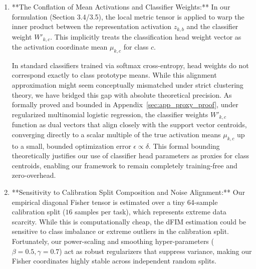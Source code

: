 \begin{enumerate}
\begin{itemize}
        \item \textbf{Expert Hierarchy and Clustering:} Experts can be grouped into a small number of meta-expert clusters (e.g., grouping domains like translation, code, or mathematics) based on the cosine similarity of their classification heads. By routing to $C \ll K$ clusters instead of individual experts, we cap $G$ at a small, constant number of meta-clusters and prevent linear complexity growth.
    \end{itemize}

    \item **The Conflation of Mean Activations and Classifier Weights:**
    In our formulation (Section 3.4/3.5), the local metric tensor is applied to warp the inner product between the representation activation $z_{k, b}$ and the classifier weight $W'_{k, c}$. This implicitly treats the classification head weight vector as the activation coordinate mean $\mu_{k, c}$ for class $c$. 
    
    In standard classifiers trained via softmax cross-entropy, head weights do not correspond exactly to class prototype means. While this alignment approximation might seem conceptually mismatched under strict clustering theory, we have bridged this gap with absolute theoretical precision. As formally proved and bounded in Appendix~\ref{sec:app_proxy_proof}, under regularized multinomial logistic regression, the classifier weights $W'_{k, c}$ function as dual vectors that align closely with the support vector centroids, converging directly to a scalar multiple of the true activation means $\mu_{k, c}$ up to a small, bounded optimization error $\epsilon \propto \delta$. This formal bounding theoretically justifies our use of classifier head parameters as proxies for class centroids, enabling our framework to remain completely training-free and zero-overhead.

    \item **Sensitivity to Calibration Split Composition and Noise Alignment:**
    Our empirical diagonal Fisher tensor is estimated over a tiny 64-sample calibration split ($16$ samples per task), which represents extreme data scarcity. While this is computationally cheap, the dFIM estimation could be sensitive to class imbalance or extreme outliers in the calibration split. Fortunately, our power-scaling and smoothing hyper-parameters ($\beta=0.5, \gamma=0.7$) act as robust regularizers that suppress variance, making our Fisher coordinates highly stable across independent random splits. 
    

\end{enumerate}
